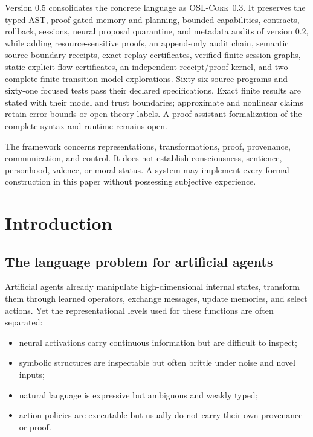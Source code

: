 \documentclass[11pt]{article}
\theoremstyle{definition}
\theoremstyle{remark}
\newcommand{\OSLCore}{\textnormal{\textsc{OSL-Core}}\xspace}
\begin{document}
\begin{statusbox}
Version 0.5 consolidates the concrete language as \OSLCore\ 0.3. It preserves the typed AST, proof-gated memory and planning, bounded capabilities, contracts, rollback, sessions, neural proposal quarantine, and metadata audits of version 0.2, while adding resource-sensitive proofs, an append-only audit chain, semantic source-boundary receipts, exact replay certificates, verified finite session graphs, static explicit-flow certificates, an independent receipt/proof kernel, and two complete finite transition-model explorations. Sixty-six source programs and sixty-one focused tests pass their declared specifications. Exact finite results are stated with their model and trust boundaries; approximate and nonlinear claims retain error bounds or open-theory labels. A proof-assistant formalization of the complete syntax and runtime remains open.
\end{statusbox}

\begin{boundarybox}
The framework concerns representations, transformations, proof, provenance, communication, and control. It does not establish consciousness, sentience, personhood, valence, or moral status. A system may implement every formal construction in this paper without possessing subjective experience.
\end{boundarybox}

\tableofcontents
\newpage

\section{Introduction}

\subsection{The language problem for artificial agents}

Artificial agents already manipulate high-dimensional internal states, transform them through learned operators, exchange messages, update memories, and select actions. Yet the representational levels used for these functions are often separated:
\begin{itemize}[leftmargin=1.6em]
  \item neural activations carry continuous information but are difficult to inspect;
  \item symbolic structures are inspectable but often brittle under noise and novel inputs;
  \item natural language is expressive but ambiguous and weakly typed;
  \item action policies are executable but usually do not carry their own provenance or proof.
\end{itemize}
\end{document}
